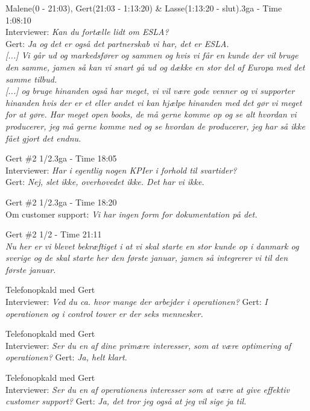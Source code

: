\begin{thebibliography}{9}
	Malene(0 - 21:03), Gert(21:03 - 1:13:20) \& Lasse(1:13:20 - slut).3ga - Time 1:08:10\\
	Interviewer: \textit{Kan du fortælle lidt om ESLA?}\\
	Gert: \textit{Ja og det er også det partnerskab vi har, det er ESLA.}\\
	\textit{[...] Vi går ud og markedsfører og sammen og hvis vi får en kunde der vil bruge den samme, jamen så kan vi snart gå ud og dække en stor del af Europa med det samme tilbud.}\\
	\textit{[...] og bruge hinanden også har meget, vi vil være gode venner og vi supporter hinanden hvis der er et eller andet vi kan hjælpe hinanden med det gør vi meget for at gøre. Har meget open books, de må gerne komme op og se alt hvordan vi producerer, jeg må gerne komme ned og se hvordan de producerer, jeg har så ikke fået gjort det endnu.}

	Gert \#2 1/2.3ga - Time 18:05\\
	Interviewer: \textit{Har i egentlig nogen KPIer i forhold til svartider?}\\
	Gert: \textit{Nej, slet ikke, overhovedet ikke. Det har vi ikke.}

	Gert \#2 1/2.3ga - Time 18:20\\
	Om customer support:
	\textit{Vi har ingen form for dokumentation på det.}

	Gert \#2 1/2 - Time 21:11\\
	\textit{Nu her er vi blevet bekræftiget i at vi skal starte en stor kunde op i danmark og sverige og de skal starte her den første januar, jamen så integrerer vi til den første januar.}

	Telefonopkald med Gert\\
	Interviewer: \textit{Ved du ca. hvor mange der arbejder i operationen?}
	 Gert: \textit{I operationen og i control tower er der seks mennesker.}

	Telefonopkald med Gert\\
	Interviewer: \textit{Ser du en af dine primære interesser, som at være optimering af operationen?} Gert: \textit{Ja, helt klart.}

	Telefonopkald med Gert\\
	Interviewer: \textit{Ser du en af operationens interesser som at være at give effektiv customer support?} Gert: \textit{Ja, det tror jeg også at jeg vil sige ja til.}


\end{thebibliography}
